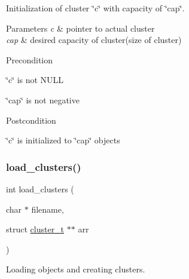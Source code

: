 Initialization of cluster \char`\"{}c\char`\"{} with capacity of \char`\"{}cap\char`\"{}. 


\begin{DoxyParams}{Parameters}
{\em c} & pointer to actual cluster\\
\hline
{\em cap} & desired capacity of cluster(size of cluster)\\
\hline
\end{DoxyParams}
\begin{DoxyPrecond}{Precondition}

\begin{DoxyItemize}
\item \char`\"{}c\char`\"{} is not N\+U\+LL
\item \char`\"{}cap\char`\"{} is not negative
\end{DoxyItemize}
\end{DoxyPrecond}
\begin{DoxyPostcond}{Postcondition}

\begin{DoxyItemize}
\item \char`\"{}c\char`\"{} is initialized to \char`\"{}cap\char`\"{} objects 
\end{DoxyItemize}
\end{DoxyPostcond}
\mbox{\label{group___cluster_operations_ga9d928923d43120cb53ddff210a087061}} 
\subsubsection{\texorpdfstring{load\+\_\+clusters()}{load\_clusters()}}
{\footnotesize\ttfamily int load\+\_\+clusters (\begin{DoxyParamCaption}\item[{char $\ast$}]{filename,  }\item[{struct \mbox{\hyperlink{structcluster__t}{cluster\+\_\+t}} $\ast$$\ast$}]{arr }\end{DoxyParamCaption})}



Loading objects and creating clusters. 


